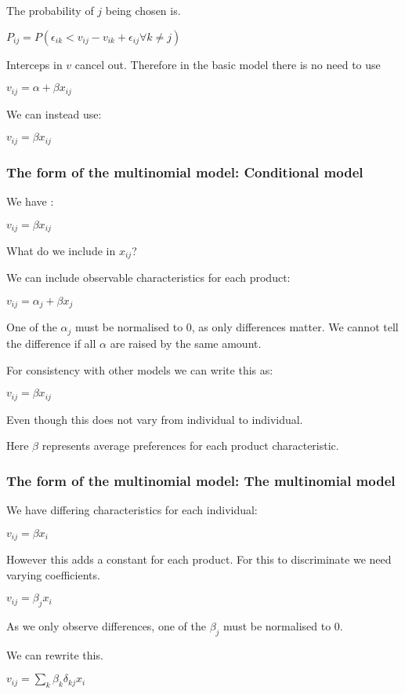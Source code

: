 The probability of \(j\) being chosen is.

\(P_{ij}=P(\epsilon_{ik} <v_{ij} -v_{ik} +\epsilon_{ij}\forall k\ne j)\)

Interceps in \(v\) cancel out. Therefore in the basic model there is no need to use

\(v_{ij}=\alpha+\beta x_{ij}\)

We can instead use:

\(v_{ij}=\beta x_{ij}\)

\subsubsection{The form of the multinomial model: Conditional model}

We have :

\(v_{ij}=\beta x_{ij}\)

What do we include in \(x_{ij}\)?

We can include observable characteristics for each product:

\(v_{ij}=\alpha_j + \beta x_j\)

One of the \(\alpha_j\) must be normalised to \(0\), as only differences matter. We cannot tell the difference if all \(\alpha \) are raised by the same amount.

For consistency with other models we can write this as:

\(v_{ij}=\beta x_{ij}\)

Even though this does not vary from individual to individual.

Here \(\beta \) represents average preferences for each product characteristic.

\subsubsection{The form of the multinomial model: The multinomial model}

We have differing characteristics for each individual:

\(v_{ij}=\beta x_i\)

However this adds a constant for each product. For this to discriminate we need varying coefficients.

\(v_{ij}=\beta_j x_i\)

As we only observe differences, one of the \(\beta_j\) must be normalised to \(0\).

We can rewrite this.

\(v_{ij}=\sum_k \beta_k\delta_{kj} x_i\)

